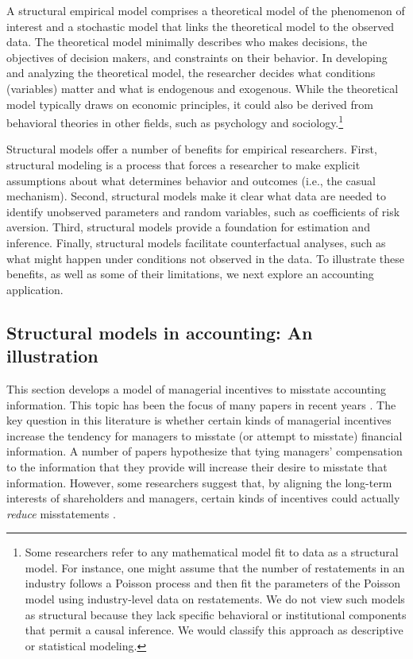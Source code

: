 A structural empirical model comprises a theoretical model of the phenomenon of interest and a stochastic model that links the theoretical model to the observed data.
The theoretical model minimally describes who makes decisions, the objectives of decision makers, and constraints on their behavior.
In developing and analyzing the theoretical model, the researcher decides what conditions (variables) matter and what is endogenous and exogenous.
While the theoretical model typically draws on economic principles, it could also be derived from behavioral theories in other fields, such as psychology and sociology.\footnote{Some
researchers refer to any mathematical model fit to data as a structural model. For instance,
one might assume that the number of restatements in an industry follows a Poisson process
and then fit the parameters of the Poisson model using industry-level data on restatements.
We do not view such models as structural because they lack specific behavioral or institutional components that permit a causal inference.
We would classify this approach as descriptive or statistical modeling.}

Structural models offer a number of benefits for empirical researchers.
First, structural modeling is a process that forces a researcher to make explicit assumptions about what determines behavior and outcomes (i.e., the casual mechanism). 
Second, structural models make it clear what data are needed to identify unobserved parameters and random variables, such as coefficients of risk aversion.
Third, structural models provide a foundation for estimation and inference. 
Finally, structural models facilitate counterfactual analyses, such as what might happen under conditions not observed in the data. 
To illustrate these benefits, as well as some of their limitations, we next explore an accounting application.

\subsection{Structural models in accounting: An illustration}
This section develops a model of managerial incentives to misstate accounting information. 
This topic has been the focus of many papers in recent years \citep[see][]{Armstrong:2010jd}.
The key question in this literature is whether certain kinds of managerial incentives increase the tendency for managers to misstate (or attempt to misstate) financial information.
A number of papers hypothesize that tying managers' compensation to the information that they provide will increase their desire to misstate that information.
However, some researchers suggest that, by aligning the long-term interests of shareholders and managers, certain kinds of incentives could actually \emph{reduce} misstatements \citep{Burns:2006ce}.

